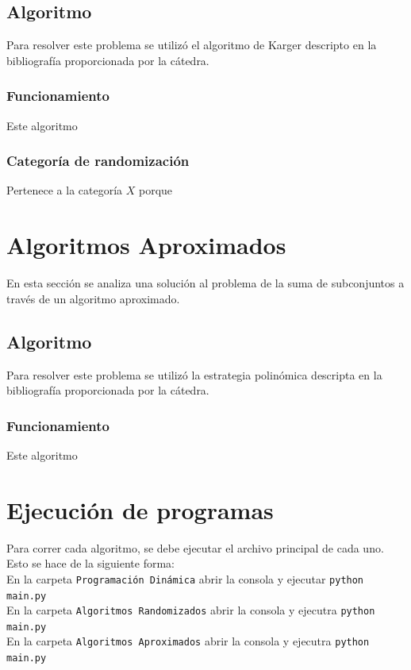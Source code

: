 \documentclass[a4paper, 10pt]{article}
\def\code#1{\texttt{#1}}
\newcommand\tab[1][0.5cm]{\hspace*{#1}}
\begin{document}
        \subsection{Algoritmo}
            \tab Para resolver este problema se utilizó el algoritmo de Karger descripto en
            la bibliografía proporcionada por la cátedra.
            \subsubsection{Funcionamiento}
                \tab Este algoritmo %
            \subsubsection{Categoría de randomización}
                \tab Pertenece a la categoría $X$ porque %
    \newpage

    \section{Algoritmos Aproximados}
        \tab En esta sección se analiza una solución al problema de la suma de subconjuntos
        a través de un algoritmo aproximado.
        \subsection{Algoritmo}
            \tab Para resolver este problema se utilizó la estrategia polinómica descripta en
            la bibliografía proporcionada por la cátedra.
            \subsubsection{Funcionamiento}
                \tab Este algoritmo %
    \newpage

    \section{Ejecución de programas}
    \tab Para correr cada algoritmo, se debe ejecutar el archivo principal de cada uno.
    Esto se hace de la siguiente forma: \\
    \tab\tab En la carpeta \code{Programación Dinámica} abrir la consola y ejecutar \code{python main.py} \\
    \tab\tab En la carpeta \code{Algoritmos Randomizados} abrir la consola y ejecutra \code{python main.py} \\
    \tab\tab En la carpeta \code{Algoritmos Aproximados} abrir la consola y ejecutra \code{python main.py} \\

\end{document}
